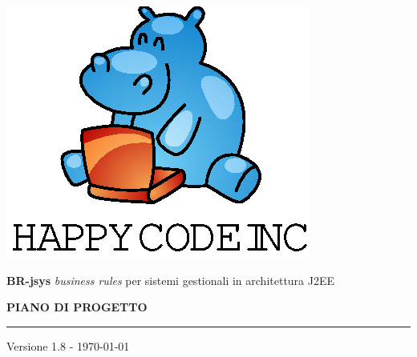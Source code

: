 \documentclass[11pt,titlepage,a4paper]{report}
\begin{document}
\newcommand{\lv}{1.8 } %
\newcommand{\Glossario}{ Glossario.1.4.pdf }

\begin{titlepage}
\begin{center}
\vspace*{0.5in}
\includegraphics{logo.eps}
\vspace*{0.2in}

{\Large \textbf{BR-jsys}}
{\Large \emph{business rules} per sistemi gestionali in architettura J2EE } 
\vspace{2in}

\LARGE \textbf {PIANO DI PROGETTO}
\par\rule{10cm}{0.4pt} \par {\large Versione \lv - \today}


\end{center}
\end{titlepage}
\vspace*{0.5in}
\end{document}
